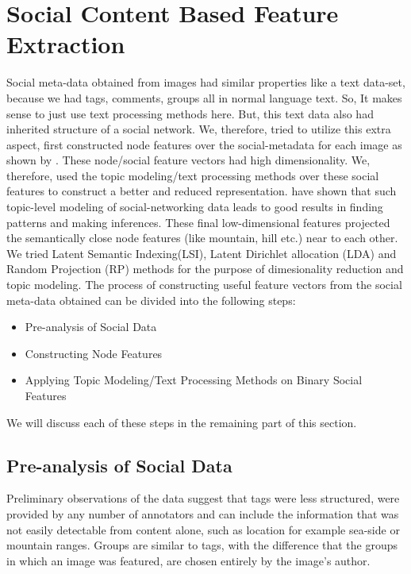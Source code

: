 \section{Social Content Based Feature Extraction}
Social meta-data obtained from images had similar properties like a text data-set, because we had tags, comments, groups all in normal 
language text. So, It makes sense to just use text processing methods here. But, this text data also had inherited structure of a social network. We, therefore, tried to utilize this extra aspect, first constructed node features over the social-metadata for 
each image as shown by \citet*{Jure}. These node/social feature vectors had high dimensionality. We, therefore, used the topic modeling/text processing methods over these social features to construct a better and reduced representation.  have shown that such topic-level modeling of social-networking data leads to good results in finding patterns and making inferences. These final low-dimensional features projected the semantically close node features (like mountain, hill etc.) near to each other. We tried Latent Semantic Indexing(LSI), Latent Dirichlet allocation (LDA) and Random Projection (RP) methods for the purpose of dimesionality reduction and topic modeling. The process of constructing useful feature vectors from the social meta-data obtained can be divided into the following steps:
\begin{itemize}
\item Pre-analysis of Social Data
\item Constructing Node Features
\item Applying Topic Modeling/Text Processing Methods on Binary Social Features
\end{itemize} 
 We will discuss each of these steps in the remaining part of this section.
\subsection{Pre-analysis of Social Data}
Preliminary observations of the data suggest that tags were less structured, were provided by any number of annotators and can include the information that was not easily detectable from content alone, such as location for example sea-side or mountain ranges. Groups are similar to tags, with the difference that the groups in which an image was featured, are chosen entirely by the image's author.
